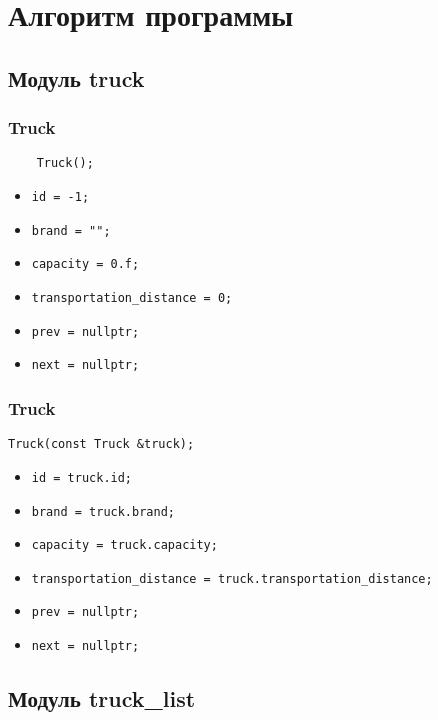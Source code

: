 \section*{Алгоритм программы}


\subsection*{Модуль truck}


\subsubsection*{Truck}

\begin{lstlisting}
	Truck();
\end{lstlisting}

\begin{itemize}
	\item \verb|id = -1;|
	\item \verb|brand = "";|
	\item \verb|capacity = 0.f;|
	\item \verb|transportation_distance = 0;|
	\item \verb|prev = nullptr;|
	\item \verb|next = nullptr;|
\end{itemize}


\subsubsection*{Truck}

\begin{lstlisting}
Truck(const Truck &truck);
\end{lstlisting}

\begin{itemize}
	\item \verb|id = truck.id;|
	\item \verb|brand = truck.brand;|
	\item \verb|capacity = truck.capacity;|
	\item \verb|transportation_distance = truck.transportation_distance;|
	\item \verb|prev = nullptr;|
	\item \verb|next = nullptr;|
\end{itemize}


\subsection*{Модуль truck\_list}


